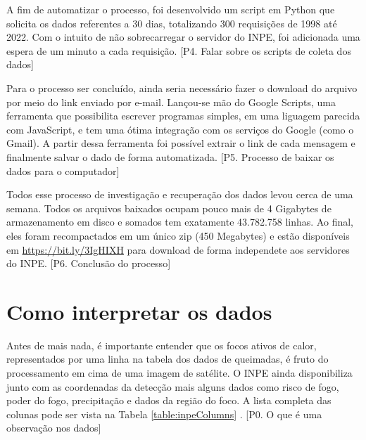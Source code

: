 \documentclass[cic,tc]{iiufrgs}
\begin{document}
A fim de automatizar o processo, foi desenvolvido um script em Python que 
solicita os dados referentes a 30 dias, totalizando 300 requisições de 1998 
até 2022. Com 
o intuito de não sobrecarregar o servidor do INPE, foi adicionada uma espera de 
um minuto a cada requisição. [P4. Falar sobre os scripts de coleta dos dados] \par

Para o processo ser concluído, ainda seria 
necessário fazer o download do arquivo por meio do link enviado por e-mail.
Lançou-se mão do Google Scripts, uma ferramenta que possibilita escrever 
programas simples, em uma liguagem parecida com JavaScript, e tem uma ótima
integração com os serviços do Google (como o Gmail). A partir dessa ferramenta
foi possível extrair o link de cada mensagem e finalmente salvar o dado
de forma automatizada. [P5. Processo de baixar os dados para o computador] \par

Todos esse processo de investigação e recuperação dos dados levou cerca de uma 
semana. Todos os arquivos baixados ocupam pouco mais de 4 Gigabytes de 
armazenamento em disco e somados tem exatamente 43.782.758 linhas. Ao final, eles 
foram recompactados em um único zip (450 Megabytes) e estão disponíveis 
em \url{https://bit.ly/3IgHIXH} para download de forma independete aos servidores 
do INPE. [P6. Conclusão do processo] \par


\section{Como interpretar os dados}

Antes de mais nada, é importante entender que os focos ativos de calor, 
representados por uma linha na tabela dos dados de queimadas, é fruto do 
processamento em cima de uma imagem de satélite. O INPE ainda 
disponibiliza junto com as coordenadas da detecção mais alguns dados como 
risco de fogo, poder do fogo, precipitação e dados da região do foco. A lista 
completa das colunas pode ser vista na Tabela \ref{table:inpeColumns}
 \cite{PerguntasFrequentesINPE}.
[P0. O que é uma observação nos dados] \par
\end{document}
